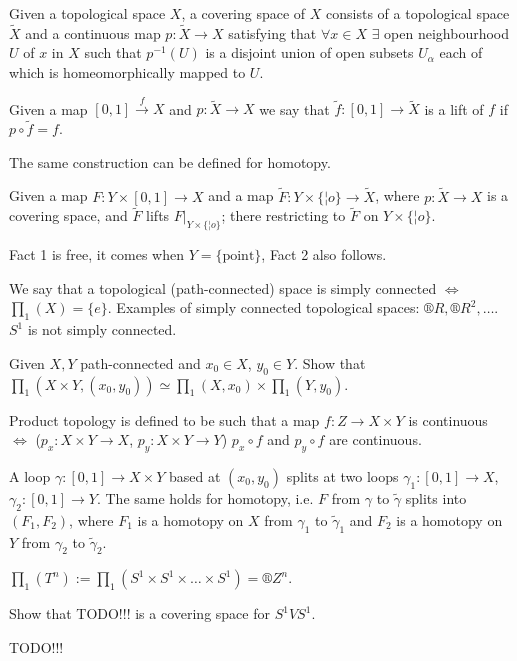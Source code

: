 \documentclass[12pt]{article}					%
\begin{document}
\begin{definice}
	Given a topological space $X$, a covering space of $X$ consists of a topological space $\tilde X$ and a continuous map $p: \tilde X \rightarrow X$ satisfying that $\forall x \in X$ $\exists$ open neighbourhood $U$ of $x$ in $X$ such that $p^{-1}(U)$ is a disjoint union of open subsets $U_α$ each of which is homeomorphically mapped to $U$.
\end{definice}

\begin{definice}
	Given a map $[0, 1] \overset{f}\rightarrow X$ and $p: \tilde X \rightarrow X$ we say that $\tilde f:[0, 1] \rightarrow \tilde X$ is a lift of $f$ if $p ∘ \tilde f = f$.

	The same construction can be defined for homotopy.
\end{definice}

\begin{tvrzeni}
	Given a map $F: Y \times [0, 1] \rightarrow X$ and a map $\tilde F: Y \times \{¦o\} \rightarrow \tilde X$, where $p: \tilde X \rightarrow X$ is a covering space, and $\tilde F$ lifts $F|_{Y \times \{¦o\}}$; there restricting to $\tilde F$ on $Y \times \{¦o\}$.

	\begin{poznamka}
		Fact 1 is free, it comes when $Y = \{\text{point}\}$, Fact 2 also follows.
	\end{poznamka}
\end{tvrzeni}


\begin{priklad}
	We say that a topological (path-connected) space is simply connected $\Leftrightarrow$ $∏_1(X) = \{e\}$. Examples of simply connected topological spaces: $®R, ®R^2, …$. $S^1$ is not simply connected.
\end{priklad}

\begin{priklad}
	Given $X, Y$ path-connected and $x_0 \in X$, $y_0 \in Y$. Show that $∏_1(X\times Y, (x_0, y_0)) \simeq ∏_1(X, x_0) \times ∏_1(Y, y_0)$.

	\begin{reseni}
		Product topology is defined to be such that a map $f: Z \rightarrow X \times Y$ is continuous $\Leftrightarrow$ ($p_x: X\times Y \rightarrow X$, $p_y: X \times Y \rightarrow Y$) $p_x ∘ f$ and $p_y ∘ f$ are continuous.

		A loop $γ: [0, 1] \rightarrow X \times Y$ based at $(x_0, y_0)$ splits at two loops $γ_1: [0, 1] \rightarrow X$, $γ_2: [0, 1] \rightarrow Y$. The same holds for homotopy, i.e. $F$ from $γ$ to $\tilde γ$ splits into $(F_1, F_2)$, where $F_1$ is a homotopy on $X$ from $γ_1$ to $\tilde γ_1$ and $F_2$ is a homotopy on $Y$ from $γ_2$ to $\tilde γ_2$.
	\end{reseni}
\end{priklad}

\begin{dusledek}
	$∏_1(T^n) := ∏_1(S^1 \times S^1 \times … \times S^1) = ®Z^n$.
\end{dusledek}

\begin{priklad}
	Show that TODO!!! is a covering space for $S^1 V S^1$.
\end{priklad}

TODO!!!
\end{document}
